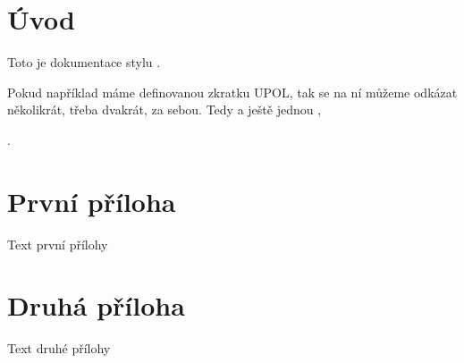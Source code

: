 \documentclass[a4paper,12pt]{article}
\begin{document}
\upmaketitle

\upmakeanot

\uptocandlists

\section{Úvod}
Toto je dokumentace stylu .


Pokud například máme definovanou zkratku UPOL, tak se na ní můžeme odkázat několikrát, třeba dvakrát, za sebou. Tedy  a ještě jednou ,

.

\upendoftreatise

\upappendix
\section{První příloha}
Text první přílohy

\section{Druhá příloha}
Text druhé přílohy

\upendoftreatise


\upprintabbrevlist

\upprinttheoremlist

\upprintbibliography

\upprintindex
\end{document}
